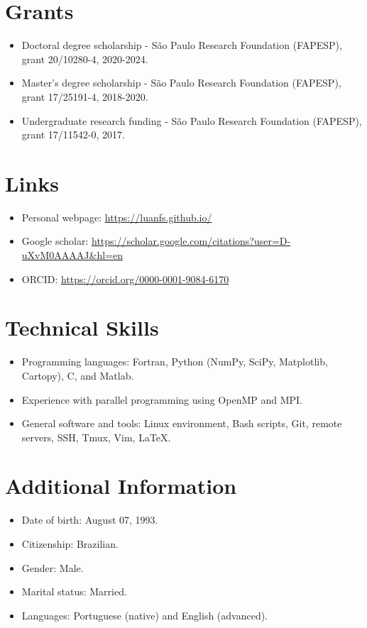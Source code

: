 \documentclass[letterpaper,11pt]{article}
\begin{document}
%
\section{Grants}
\begin{itemize}
	\item Doctoral degree scholarship  - São Paulo Research Foundation (FAPESP),  grant 20/10280-4, 2020-2024.		
	\item Master's degree scholarship   - São Paulo Research Foundation (FAPESP),  grant 17/25191-4, 2018-2020.
	\item Undergraduate research funding  - São Paulo Research Foundation (FAPESP), grant 17/11542-0, 2017.
\end{itemize}

 
%
\section{Links}
\begin{itemize}
	\item Personal webpage:  \href{https://luanfs.github.io/}{https://luanfs.github.io/}
	\item Google scholar: \href{https://scholar.google.com/citations?user=D-uXvM0AAAAJ&hl=en}{https://scholar.google.com/citations?user=D-uXvM0AAAAJ\&hl=en}
	\item ORCID:  \href{https://orcid.org/0000-0001-9084-6170}{https://orcid.org/0000-0001-9084-6170}
\end{itemize}

 
%
\section{Technical Skills}
\begin{itemize}
	\item Programming languages: Fortran, Python (NumPy, SciPy, Matplotlib, Cartopy), C, and Matlab.
	\item Experience with parallel programming using OpenMP and MPI.
	\item General software and tools: Linux environment, Bash scripts, Git, remote servers, SSH, Tmux, Vim, \LaTeX.
\end{itemize}


\section{Additional Information}
\begin{itemize}
	\item Date of birth: August 07, 1993.
	\item Citizenship: Brazilian.
	\item Gender: Male.
	\item Marital status: Married. %
	\item Languages: Portuguese (native) and English (advanced).
\end{itemize}




\end{document}
